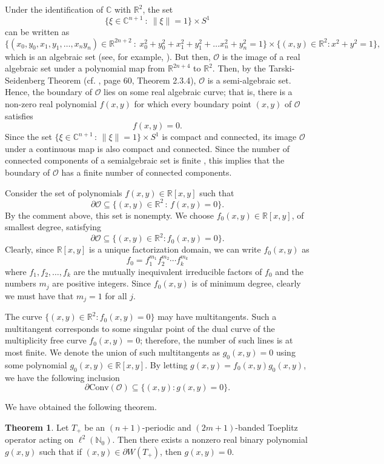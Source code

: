 \documentclass[12pt,reqno]{amsart}
\theoremstyle{definition}
\newtheorem{theorem}{Theorem}[section]
\newcommand{\parn}[1]{\left( #1 \right)}%
\newcommand{\conv}[1]{\mathrm{Conv}\parn{#1}}	%
\newcommand{\R}{{\mathbb{R}}}
\newcommand{\C}{{\mathbb{C}}}
\begin{document}
    Under the identification of ${\mathbb C}$ with ${\mathbb R}^2$, the set
\[
\{ \xi \in {\mathbb C}^{n+1} \ : \ \| \xi \|=1 \} \times S^1 
\]
can be written as
\[ 
\{ (x_0, y_0, x_1, y_1, \dots, x_n y_n) \in \R^{2n+2} \ : \ x_0^2 + y_0^2 + x_1^2+y_1^2 + \dots x_n^2 + y_n^2 =1 \} \times \{(x, y) \in {\mathbb R}^2: x^2 +y^2 =1 \},
\]
which is an algebraic set (see, for example, \cite{Bene-Risl}). But then, ${\mathcal O}$ is the image of a real algebraic set under a polynomial map from $\R^{2n+4}$ to $\R^2$. Then, by the Tarski-Seidenberg Theorem (cf. \cite{Bene-Risl}, page 60, Theorem 2.3.4), ${\mathcal O}$ is a semi-algebraic set. Hence, the boundary of $\mathcal O$ lies on some real algebraic curve; that is, there is a non-zero real polynomial $f(x, y)$ for which every boundary point $(x, y)$ of ${\mathcal O}$ satisfies
 \[
 f(x, y)=0.
 \]
Since the set $\{ \xi \in \C^{n+1} \, : \, \| \xi \|=1 \} \times S^1$ is  compact and connected, its image ${\mathcal O}$ under 
a continuous map is also compact and connected. Since the number of connected components of a semialgebraic set is finite \cite[Theorem 2.4.5]{BoCoRo}, this implies that the boundary of $\mathcal O$ has a finite number of connected components. 

Consider the set of polynomials $f(x,y) \in \R[x,y]$ such that
\[
\partial {\mathcal O} \subseteq \{ (x,y) \in \R^2 \, : \, f(x,y)= 0 \}.
\]
By the comment above, this set is nonempty. We choose $f_0(x,y) \in \R[x,y]$, of smallest degree, satisfying 
\[
\partial {\mathcal O} \subseteq \{(x, y) \in {\mathbb R}^2:f_0(x, y)=0 \}.
\]
Clearly, since $\R[x,y]$ is a unique factorization domain, we can write $f_0(x,y)$ as
\[
f_0=f_1^{m_1} f_2^{m_2} \cdots f_k^{m_k}
\]
where $f_1, f_2, \ldots, f_k$ are the mutually inequivalent irreducible factors of $f_0$ and the numbers $m_j$ are positive integers. Since $f_0(x,y)$ is of minimum degree, clearly we must have that $m_j=1$ for all $j$.

The curve $\{(x, y) \in \R^2: f_0(x,y)=0 \}$ may have multitangents. Such a multitangent corresponds to some singular point of the dual curve of the multiplicity free curve $f_0(x, y)=0$; therefore, the number of such lines is at most finite. We denote the union of such multitangents as $g_0(x, y)=0$ using some 
polynomial $g_0(x, y) \in {\mathbb R}[x,y]$. By letting $g(x, y)=f_0(x, y) g_0(x,y)$, we have the following inclusion
\[
\partial \conv{{\mathcal O}} \subseteq \{(x, y): g(x, y) =0 \}.
\]

We have obtained the following theorem.
\begin{theorem}
Let $T_+$ be an $(n+1)$-periodic and $(2m+1)$-banded Toeplitz operator acting on $\ell^2({\mathbb N_0})$. Then there exists a nonzero real binary polynomial $g(x, y)$ such that if $ (x, y)
\in \partial W(T_+)$, then $g(x, y)=0$.
\end{theorem}
    
\end{document}
